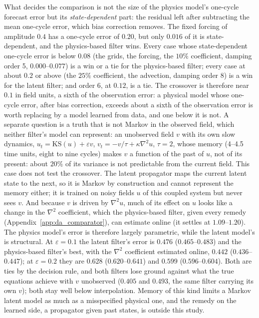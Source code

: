  What decides the comparison is not the size of the
physics model's one-cycle forecast error but its \emph{state-dependent}
part: the residual left after subtracting the mean one-cycle error,
which bias correction removes. The fixed forcing of amplitude $0.4$ has a
one-cycle error of $0.20$, but only $0.016$ of it is state-dependent, and the
physics-based filter wins. Every case whose state-dependent one-cycle
error is below $0.08$ (the grids, the forcing, the $10\%$ coefficient, damping
order 5, $0.000$--$0.077$) is a win or a tie for the physics-based filter; every
case at about $0.2$ or above (the $25\%$ coefficient, the advection, damping order
8) is a win for the latent filter; and order 6, at $0.12$, is a tie. The crossover is therefore near $0.1$ in field units, a
sixth of the observation error: a physical model whose one-cycle error,
after bias correction, exceeds about a sixth of the observation error is
worth replacing by a model learned from data, and one below it is not.
A separate question is a truth that is not Markov in the observed field, which
neither filter's model can represent: an
unobserved field $v$ with its own slow dynamics, $u_t=\mathrm{KS}(u)+\varepsilon v$,
$v_t=-v/\tau+\kappa\nabla^2u$, $\tau=2$, whose memory (4--4.5 time units, eight to nine cycles) makes $v$ a
function of the past of $u$, not of its present: about $20\%$ of its variance is not predictable from
the current field. This case does not test the crossover. The latent propagator maps the current
latent state to the next, so it is Markov by construction and cannot represent the memory either;
it is trained on noisy fields $u$ of this coupled system but never sees $v$. And because $v$ is
driven by $\nabla^2u$, much of its effect on $u$ looks like a change in the $\nabla^2$ coefficient,
which the physics-based filter, given every remedy (Appendix~\ref{app:da_comparator}), can estimate
online (it settles at $1.09$--$1.20$). The physics model's
error is therefore largely parametric, while the latent model's is structural. At $\varepsilon=0.1$
the latent filter's error is $0.476$ ($0.465$--$0.483$) and the physics-based filter's best, with
the $\nabla^2$ coefficient estimated online, $0.442$ ($0.436$--$0.447$); at $\varepsilon=0.2$ they are
$0.628$ ($0.620$--$0.641$) and $0.599$ ($0.596$--$0.604$). Both are ties by the decision rule, and
both filters lose ground against what the true equations achieve with $v$ unobserved ($0.405$ and
$0.493$, the same filter carrying its own $v$); both stay well below interpolation. Memory of this
kind limits a Markov latent model as much as a misspecified physical one, and the remedy on the
learned side, a propagator given past states, is outside this study.

